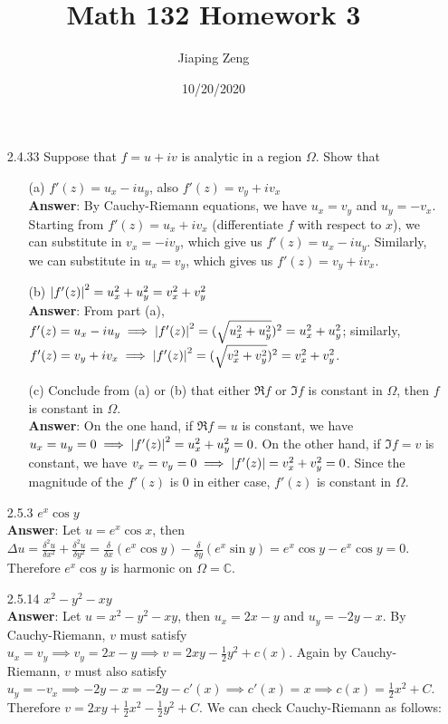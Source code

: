 \documentclass{article}
\title{Math 132 Homework 3}
\date{10/20/2020}
\author{Jiaping Zeng}
\begin{document}
\maketitle

\begin{itemize}
      \item [2.4.33] Suppose that $f=u+iv$ is analytic in a region $\Omega$. Show that
            \begin{itemize}
                  \item [(a)] $f'(z)=u_x-iu_y$, also $f'(z)=v_y+iv_x$\\
                        \textbf{Answer}: By Cauchy-Riemann equations, we have $u_x=v_y$ and $u_y=-v_x$. Starting from $f'(z)=u_x+iv_x$ (differentiate $f$ with respect to $x$), we can substitute in $v_x=-iv_y$, which give us $f'(z)=u_x-iu_y$. Similarly, we can substitute in $u_x=v_y$, which gives us $f'(z)=v_y+iv_x$.
                  \item [(b)] $\abs{f'(z)}^2=u_x^2+u_y^2=v_x^2+v_y^2$\\
                        \textbf{Answer}: From part (a), $f'(z)=u_x-iu_y\implies\abs{f'(z)}^2=(\sqrt{u_x^2+u_y^2})^2=u_x^2+u_y^2$; similarly, $f'(z)=v_y+iv_x\implies\abs{f'(z)}^2=(\sqrt{v_x^2+v_y^2})^2=v_x^2+v_y^2$.
                  \item [(c)] Conclude from (a) or (b) that either $\Re f$ or $\Im f$ is constant in $\Omega$, then $f$ is constant in $\Omega$.\\
                        \textbf{Answer}: On the one hand, if $\Re f=u$ is constant, we have $u_x=u_y=0\implies\abs{f'(z)}^2=u_x^2+u_y^2=0$. On the other hand, if $\Im f=v$ is constant, we have $v_x=v_y=0\implies\abs{f'(z)}=v_x^2+v_y^2=0$. Since the magnitude of the $f'(z)$ is $0$ in either case, $f'(z)$ is constant in $\Omega$.
            \end{itemize}
      \item [2.5.3] $e^x\cos y$\\
            \textbf{Answer}: Let $u=e^x\cos x$, then $\Delta u=\frac{\delta^2 u}{\delta x^2}+\frac{\delta^2 u}{\delta y^2}=\frac{\delta}{\delta x}(e^x\cos y)-\frac{\delta}{\delta y}(e^x\sin y)=e^x\cos y-e^x\cos y=0$. Therefore $e^x\cos y$ is harmonic on $\Omega=\mathbb{C}$.
      \item [2.5.14] $x^2-y^2-xy$\\
            \textbf{Answer}: Let $u=x^2-y^2-xy$, then $u_x=2x-y$ and $u_y=-2y-x$. By Cauchy-Riemann, $v$ must satisfy $u_x=v_y\implies v_y=2x-y\implies v=2xy-\frac{1}{2}y^2+c(x)$. Again by Cauchy-Riemann, $v$ must also satisfy $u_y=-v_x\implies -2y-x=-2y-c'(x)\implies c'(x)=x\implies c(x)=\frac{1}{2}x^2+C$. Therefore $v=2xy+\frac{1}{2}x^2-\frac{1}{2}y^2+C$. We can check Cauchy-Riemann as follows:\\

\end{itemize}
\end{document}
